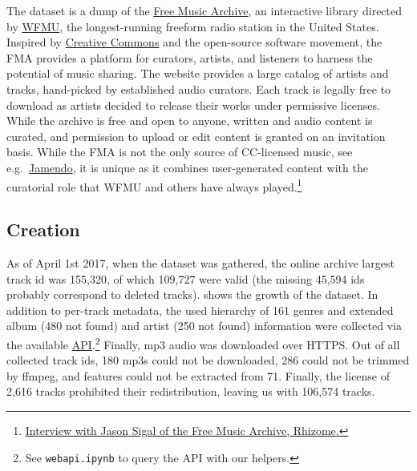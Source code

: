 \documentclass{article}
\newcommand{\ntracks}{106,574 }
\begin{document}
The dataset is a dump of the \href{https://freemusicarchive.org/}{Free Music Archive}, an interactive library directed by \href{https://wfmu.org/}{WFMU}, the longest-running freeform radio station in the United States.
Inspired by \href{https://creativecommons.org/}{Creative Commons} and the open-source software movement, the FMA provides a platform for curators, artists, and listeners to harness the potential of music sharing.
The website provides a large catalog of artists and tracks, hand-picked by established audio curators. Each track is legally free to download as artists decided to release their works under permissive licenses.
While the archive is free and open to anyone, written and audio content is curated, and permission to upload or edit content is granted on an invitation basis. While the FMA is not the only source of CC-licensed music, see e.g.\ \href{https://www.jamendo.com}{Jamendo}, it is unique as it combines user-generated content with the curatorial role that WFMU and others have always played.\footnote{\href{http://rhizome.org/editorial/2009/may/1/interview-with-jason-sigal-of-the-free-music-archi}{Interview with Jason Sigal of the Free Music Archive, Rhizome.}}

\subsection{Creation} %

As of April 1st 2017, when the dataset was gathered, the online archive largest track id was 155,320, of which 109,727 were valid (the missing 45,594 ids probably correspond to deleted tracks).  shows the growth of the dataset. In addition to per-track metadata, the used hierarchy of 161 genres and extended album (480 not found) and artist (250 not found) information were collected via the available \href{https://freemusicarchive.org/api}{API}.\footnote{See \texttt{webapi.ipynb} to query the API with our helpers.} Finally, mp3 audio was downloaded over HTTPS.
Out of all collected track ids, 180 mp3s could not be downloaded, 286 could not be trimmed by ffmpeg, and features could not be extracted from 71. Finally, the license of 2,616 tracks prohibited their redistribution, leaving us with \ntracks tracks.
\end{document}

